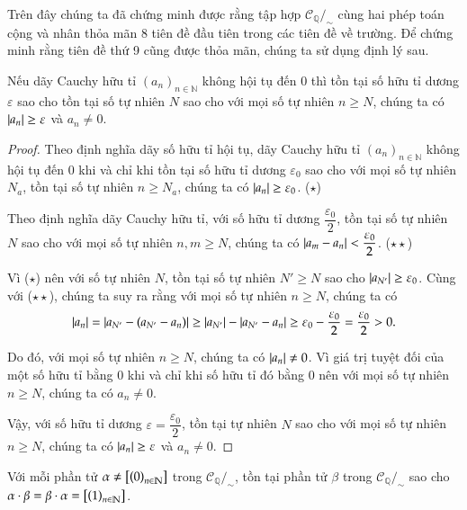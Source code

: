 Trên đây chúng ta đã chứng minh được rằng tập hợp $\mathscr{C}_{\mathbb{Q}}/_{\sim}$ cùng hai phép toán cộng và nhân thỏa mãn 8 tiên đề đầu tiên trong các tiên đề về trường. Để chứng minh rằng tiên đề thứ 9 cũng được thỏa mãn, chúng ta sử dụng định lý sau.
\begin{theorem}\label{theorem:nonzero-cauchy-sequences}
    Nếu dãy Cauchy hữu tỉ ${(a_{n})}_{n\in\mathbb{N}}$ không hội tụ đến $0$ thì tồn tại số hữu tỉ dương $\varepsilon$ sao cho tồn tại số tự nhiên $N$ sao cho với mọi số tự nhiên $n\geq N$, chúng ta có $\left\vert{a_{n}}\right\vert\geq \varepsilon$ và $a_{n}\ne 0$.
\end{theorem}

\begin{proof}
    Theo định nghĩa dãy số hữu tỉ hội tụ, dãy Cauchy hữu tỉ ${(a_{n})}_{n\in\mathbb{N}}$ không hội tụ đến $0$ khi và chỉ khi tồn tại số hữu tỉ dương $\varepsilon_{0}$ sao cho với mọi số tự nhiên $N_{a}$, tồn tại số tự nhiên $n\geq N_{a}$, chúng ta có $\left\vert{a_{n}}\right\vert \geq \varepsilon_{0}$. ($\star$)

    Theo định nghĩa dãy Cauchy hữu tỉ, với số hữu tỉ dương $\dfrac{\varepsilon_{0}}{2}$, tồn tại số tự nhiên $N$ sao cho với mọi số tự nhiên $n, m\geq N$, chúng ta có $\left\vert{a_{m} - a_{n}}\right\vert < \dfrac{\varepsilon_{0}}{2}$. ($\star\star$)

    Vì ($\star$) nên với số tự nhiên $N$, tồn tại số tự nhiên $N'\geq N$ sao cho $\left\vert{a_{N'}}\right\vert \geq \varepsilon_{0}$. Cùng với ($\star\star$), chúng ta suy ra rằng với mọi số tự nhiên $n\geq N$, chúng ta có
    \[
        \left\vert{a_{n}}\right\vert = \left\vert{a_{N'} - (a_{N'} - a_{n})}\right\vert \geq \left\vert{a_{N'}}\right\vert - \left\vert{a_{N'} - a_{n}}\right\vert \geq \varepsilon_{0} - \frac{\varepsilon_{0}}{2} = \frac{\varepsilon_{0}}{2} > 0.
    \]

    Do đó, với mọi số tự nhiên $n\geq N$, chúng ta có $\left\vert{a_{n}}\right\vert\ne 0$. Vì giá trị tuyệt đối của một số hữu tỉ bằng $0$ khi và chỉ khi số hữu tỉ đó bằng $0$ nên với mọi số tự nhiên $n\geq N$, chúng ta có $a_{n}\ne 0$.

    Vậy, với số hữu tỉ dương $\varepsilon = \dfrac{\varepsilon_{0}}{2}$, tồn tại tự nhiên $N$ sao cho với mọi số tự nhiên $n\geq N$, chúng ta có $\left\vert{a_{n}}\right\vert\geq \varepsilon$ và $a_{n}\ne 0$.
\end{proof}

\begin{theorem}
    Với mỗi phần tử $\alpha\ne \left[{\left({0}\right)}_{{n}\in\mathbb{N}}\right]$ trong $\mathscr{C}_{\mathbb{Q}}/_{\sim}$, tồn tại phần tử $\beta$ trong $\mathscr{C}_{\mathbb{Q}}/_{\sim}$ sao cho $\alpha\cdot\beta = \beta\cdot\alpha = \left[{\left({1}\right)}_{{n}\in\mathbb{N}}\right]$.
\end{theorem}

